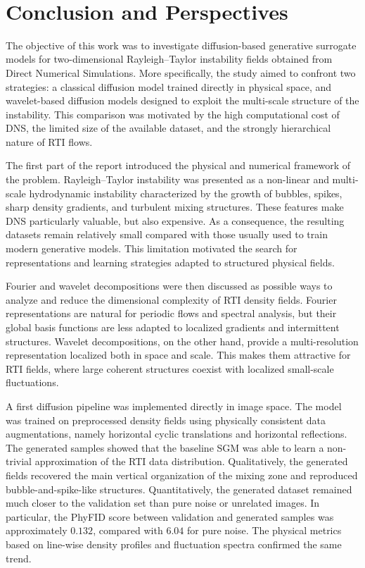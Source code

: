 
﻿\chapter{Conclusion and Perspectives}
\label{chap:conclusion}

The objective of this work was to investigate diffusion-based generative
surrogate models for two-dimensional Rayleigh--Taylor instability fields
obtained from Direct Numerical Simulations. More specifically, the study aimed
to confront two strategies: a classical diffusion model trained directly in
physical space, and wavelet-based diffusion models designed to exploit the
multi-scale structure of the instability. This comparison was motivated by the
high computational cost of DNS, the limited size of the available dataset, and
the strongly hierarchical nature of RTI flows.

The first part of the report introduced the physical and numerical framework of
the problem. Rayleigh--Taylor instability was presented as a non-linear and
multi-scale hydrodynamic instability characterized by the growth of bubbles,
spikes, sharp density gradients, and turbulent mixing structures. These
features make DNS particularly valuable, but also expensive. As a consequence,
the resulting datasets remain relatively small compared with those usually used
to train modern generative models. This limitation motivated the search for
representations and learning strategies adapted to structured physical fields.

Fourier and wavelet decompositions were then discussed as possible ways to
analyze and reduce the dimensional complexity of RTI density fields. Fourier
representations are natural for periodic flows and spectral analysis, but their
global basis functions are less adapted to localized gradients and intermittent
structures. Wavelet decompositions, on the other hand, provide a
multi-resolution representation localized both in space and scale. This makes
them attractive for RTI fields, where large coherent structures coexist with
localized small-scale fluctuations.

A first diffusion pipeline was implemented directly in image space. The model
was trained on preprocessed density fields using physically consistent data
augmentations, namely horizontal cyclic translations and horizontal
reflections. The generated samples showed that the baseline SGM was able to
learn a non-trivial approximation of the RTI data distribution. Qualitatively,
the generated fields recovered the main vertical organization of the mixing
zone and reproduced bubble-and-spike-like structures. Quantitatively, the
generated dataset remained much closer to the validation set than pure noise or
unrelated images. In particular, the PhyFID score between validation and
generated samples was approximately $0.132$, compared with $6.04$ for pure
noise. The physical metrics based on line-wise density profiles and fluctuation
spectra confirmed the same trend.

